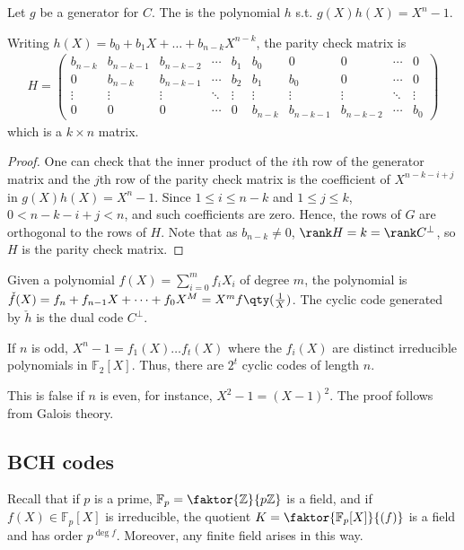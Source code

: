 \begin{definition}
    Let $g$ be a generator for $C$.
    The  is the polynomial $h$ s.t. $g(X) h(X) = X^n - 1$.
\end{definition}
\begin{corollary}
    Writing $h(X) = b_0 + b_1 X + \dots + b_{n-k} X^{n-k}$, the parity check matrix is
    \begin{align*}
        H = \begin{pmatrix}
            b_{n-k} & b_{n-k-1} & b_{n-k-2} & \cdots & b_1 & b_0 & 0 & 0 & \cdots & 0 \\
            0 & b_{n-k} & b_{n-k-1} & \cdots & b_2 & b_1 & b_0 & 0 & \cdots & 0 \\
            \vdots & \vdots & \vdots & \ddots & \vdots & \vdots & \vdots & \vdots & \ddots & \vdots \\
            0 & 0 & 0 & \cdots & 0 & b_{n-k} & b_{n-k-1} & b_{n-k-2} & \cdots & b_0
        \end{pmatrix}
    \end{align*}
    which is a $k \times n$ matrix.
\end{corollary}
\begin{proof}
    One can check that the inner product of the $i$th row of the generator matrix and the $j$th row of the parity check matrix is the coefficient of $X^{n-k-i+j}$ in $g(X) h(X) = X^n - 1$.
    Since $1 \leq i \leq n - k$ and $1 \leq j \leq k$, $0 < n - k - i + j < n$, and such coefficients are zero.
    Hence, the rows of $G$ are orthogonal to the rows of $H$.
    Note that as $b_{n-k} \neq 0$, $\rank H = k = \rank C^\perp$, so $H$ is the parity check matrix.
\end{proof}
\begin{remark}
    Given a polynomial $f(X) = \sum_{i=0}^m f_i X_i$ of degree $m$, the  polynomial is $\check{f}(X) = f_n + f_{n-1}X + \dots + f_0 X^M = X^m f\qty(\frac{1}{X})$.
    The cyclic code generated by $\check{h}$ is the dual code $C^\perp$.
\end{remark}
\begin{lemma}
    If $n$ is odd, $X^n - 1 = f_1(X) \dots f_t(X)$ where the $f_i(X)$ are distinct irreducible polynomials in $\mathbb F_2[X]$.
    Thus, there are $2^t$ cyclic codes of length $n$.
\end{lemma}
This is false if $n$ is even, for instance, $X^2 - 1 = (X - 1)^2$.
The proof follows from Galois theory.

\subsection{BCH codes}
Recall that if $p$ is a prime, $\mathbb F_p = \faktor{\mathbb Z}{p\mathbb Z}$ is a field, and if $f(X) \in \mathbb F_p[X]$ is irreducible, the quotient $K = \faktor{\mathbb F_p[X]}{(f)}$ is a field and has order $p^{\deg f}$.
Moreover, any finite field arises in this way.

